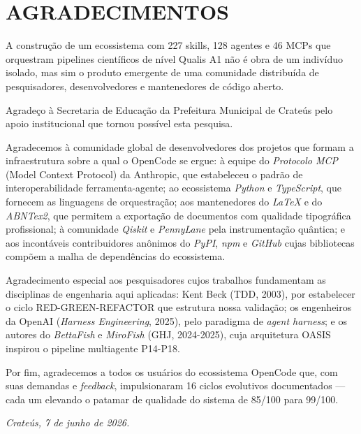 \chapter*{AGRADECIMENTOS}
\thispagestyle{empty}

A construção de um ecossistema com 227 skills, 128 agentes e 46 MCPs que orquestram pipelines científicos de nível Qualis A1 não é obra de um indivíduo isolado, mas sim o produto emergente de uma comunidade distribuída de pesquisadores, desenvolvedores e mantenedores de código aberto.

Agradeço à Secretaria de Educação da Prefeitura Municipal de Crateús pelo apoio institucional que tornou possível esta pesquisa.

Agradecemos à comunidade global de desenvolvedores dos projetos que formam a infraestrutura sobre a qual o OpenCode se ergue: à equipe do \textit{Protocolo MCP} (Model Context Protocol) da Anthropic, que estabeleceu o padrão de interoperabilidade ferramenta-agente; ao ecossistema \textit{Python} e \textit{TypeScript}, que fornecem as linguagens de orquestração; aos mantenedores do \textit{LaTeX} e do \textit{ABNTex2}, que permitem a exportação de documentos com qualidade tipográfica profissional; à comunidade \textit{Qiskit} e \textit{PennyLane} pela instrumentação quântica; e aos incontáveis contribuidores anônimos do \textit{PyPI}, \textit{npm} e \textit{GitHub} cujas bibliotecas compõem a malha de dependências do ecossistema.

Agradecimento especial aos pesquisadores cujos trabalhos fundamentam as disciplinas de engenharia aqui aplicadas: Kent Beck (TDD, 2003), por estabelecer o ciclo RED-GREEN-REFACTOR que estrutura nossa validação; os engenheiros da OpenAI (\textit{Harness Engineering}, 2025), pelo paradigma de \textit{agent harness}; e os autores do \textit{BettaFish} e \textit{MiroFish} (GHJ, 2024-2025), cuja arquitetura OASIS inspirou o pipeline multiagente P14-P18.

Por fim, agradecemos a todos os usuários do ecossistema OpenCode que, com suas demandas e \textit{feedback}, impulsionaram 16 ciclos evolutivos documentados --- cada um elevando o patamar de qualidade do sistema de 85/100 para 99/100.

\vspace{1cm}
\begin{flushright}
  \textit{Crateús, 7 de junho de 2026.}
\end{flushright}
\newpage
